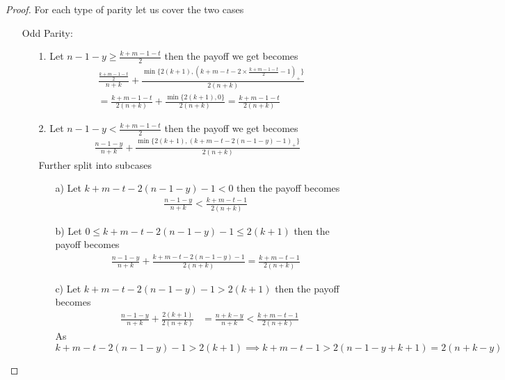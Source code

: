\documentclass[a4paper,10pt]{article}
\newcommand{\pospart}[1]{\left( #1 \right)_{+}}
\theoremstyle{definition}
\theoremstyle{definition}
\theoremstyle{remark}
\theoremstyle{definition}
\begin{document}
\begin{proof}
For each type of parity let us cover the two cases
\begin{itemize}
\item[Odd Parity:]
\begin{itemize}
\item[1.]Let $n-1-y \geq \frac{k+m-1-t}{2}$ then the payoff we get becomes
\begin{align*}
&\frac{\frac{k+m-1-t}{2}}{n+k}+\frac{\min \{ 2(k+1),\pospart{k+m-t-2 \times \frac{k+m-1-t}{2}-1} \}}{2(n+k)} \\
&=\frac{k+m-1-t}{2(n+k)} +\frac{\min \{ 2(k+1),0 \}}{2(n+k)}
=\frac{k+m-1-t}{2(n+k)}
\end{align*}
\item[2.]Let $n-1-y < \frac{k+m-1-t}{2}$ then the payoff we get becomes
\begin{align*}
\frac{n-1-y}{n+k}+\frac{\min \{ 2(k+1),\pospart{k+m-t-2(n-1-y)-1} \}}{2(n+k)}
\end{align*}
Further split into subcases
\begin{itemize}
\item[a)]Let $k+m-t-2(n-1-y)-1<0$ then the payoff becomes
\begin{align*}
\frac{n-1-y}{n+k}<\frac{k+m-t-1}{2(n+k)}
\end{align*}
\item[b)]Let $0 \leq k+m-t-2(n-1-y)-1 \leq 2(k+1)$ then the payoff becomes
\begin{align*}
\frac{n-1-y}{n+k} +\frac{k+m-t-2(n-1-y)-1}{2(n+k)}=\frac{k+m-t-1}{2(n+k)}
\end{align*}
\item[c)]Let $k+m-t-2(n-1-y)-1 > 2(k+1)$ then the payoff becomes
\begin{align*}
&\frac{n-1-y}{n+k}+\frac{2(k+1)}{2(n+k)}
&=\frac{n+k-y}{n+k} < \frac{k+m-t-1}{2(n+k)}
\end{align*}
As $k+m-t-2(n-1-y)-1 > 2(k+1) \implies k+m-t-1 > 2(n-1-y+k+1)=2(n+k-y)$
\end{itemize}
\end{itemize}


\end{itemize}
\end{proof}
\end{document}
